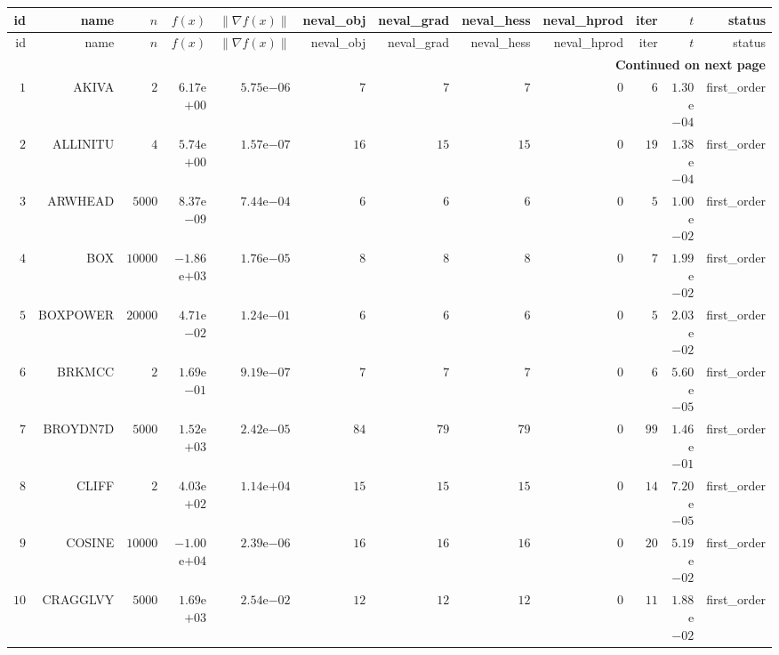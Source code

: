 \begin{longtable}{rrrrrrrrrrrr}
  \hline
  id & name & \(n\) & \(f(x)\) & \(\|\nabla f(x)\|\) & neval\_obj & neval\_grad & neval\_hess & neval\_hprod & iter & \(t\) & status \\\hline
  \endfirsthead
  \hline
  id & name & \(n\) & \(f(x)\) & \(\|\nabla f(x)\|\) & neval\_obj & neval\_grad & neval\_hess & neval\_hprod & iter & \(t\) & status \\\hline
  \endhead
  \hline
  \multicolumn{12}{r}{{\bfseries Continued on next page}}\\
  \hline
  \endfoot
  \endlastfoot
  \(     1\) & AKIVA & \(     2\) & \( 6.17\)e\(+00\) & \( 5.75\)e\(-06\) & \(     7\) & \(     7\) & \(     7\) & \(     0\) & \(     6\) & \( 1.30\)e\(-04\) & first\_order \\
  \(     2\) & ALLINITU & \(     4\) & \( 5.74\)e\(+00\) & \( 1.57\)e\(-07\) & \(    16\) & \(    15\) & \(    15\) & \(     0\) & \(    19\) & \( 1.38\)e\(-04\) & first\_order \\
  \(     3\) & ARWHEAD & \(  5000\) & \( 8.37\)e\(-09\) & \( 7.44\)e\(-04\) & \(     6\) & \(     6\) & \(     6\) & \(     0\) & \(     5\) & \( 1.00\)e\(-02\) & first\_order \\
  \(     4\) & BOX & \( 10000\) & \(-1.86\)e\(+03\) & \( 1.76\)e\(-05\) & \(     8\) & \(     8\) & \(     8\) & \(     0\) & \(     7\) & \( 1.99\)e\(-02\) & first\_order \\
  \(     5\) & BOXPOWER & \( 20000\) & \( 4.71\)e\(-02\) & \( 1.24\)e\(-01\) & \(     6\) & \(     6\) & \(     6\) & \(     0\) & \(     5\) & \( 2.03\)e\(-02\) & first\_order \\
  \(     6\) & BRKMCC & \(     2\) & \( 1.69\)e\(-01\) & \( 9.19\)e\(-07\) & \(     7\) & \(     7\) & \(     7\) & \(     0\) & \(     6\) & \( 5.60\)e\(-05\) & first\_order \\
  \(     7\) & BROYDN7D & \(  5000\) & \( 1.52\)e\(+03\) & \( 2.42\)e\(-05\) & \(    84\) & \(    79\) & \(    79\) & \(     0\) & \(    99\) & \( 1.46\)e\(-01\) & first\_order \\
  \(     8\) & CLIFF & \(     2\) & \( 4.03\)e\(+02\) & \( 1.14\)e\(+04\) & \(    15\) & \(    15\) & \(    15\) & \(     0\) & \(    14\) & \( 7.20\)e\(-05\) & first\_order \\
  \(     9\) & COSINE & \( 10000\) & \(-1.00\)e\(+04\) & \( 2.39\)e\(-06\) & \(    16\) & \(    16\) & \(    16\) & \(     0\) & \(    20\) & \( 5.19\)e\(-02\) & first\_order \\
  \(    10\) & CRAGGLVY & \(  5000\) & \( 1.69\)e\(+03\) & \( 2.54\)e\(-02\) & \(    12\) & \(    12\) & \(    12\) & \(     0\) & \(    11\) & \( 1.88\)e\(-02\) & first\_order \\

\end{longtable}
